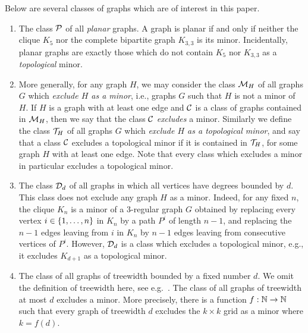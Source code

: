 \begin{example}\label{ex:classes}
Below are several classes of graphs which are of interest 
in this paper.
\begin{enumerate}
	\item The class $\cal P$ of all \emph{planar} graphs. A  graph is planar if and only if neither the clique $K_5$ nor the complete bipartite graph $K_{3,3}$ is its minor. Incidentally, planar graphs are exactly those which do not contain $K_5$ nor $K_{3,3}$ as a \emph{topological} minor.

	\item More generally, for any graph $H$, we may consider the class ${\cal M}_H$ of all graphs $G$ which \emph{exclude $H$ as a minor}, i.e., graphs $G$ such that $H$ is not a minor of $H$. If $H$ is a graph with at least one edge and ${\cal C}$ is a class of graphs contained in ${\cal M}_H$, then we say that the class ${\cal C}$
	\emph{excludes} a minor.
	Similarly we define the class ${\cal T}_H$ of all graphs $G$ which \emph{exclude $H$ as a topological minor},
	and say that a class ${\cal C}$ excludes a topological minor if it is contained in ${\cal T}_H$, for some graph $H$ with at least one edge. Note that every class which excludes a  minor in particular excludes a topological minor.
	
	
	\item The class ${\cal D}_d$ of all graphs in which all vertices have degrees bounded by $d$.
	This class does not exclude any graph $H$ as a minor. Indeed, for any fixed $n$, the clique $K_n$
	is a minor of a $3$-regular graph $G$ obtained by replacing every vertex $i\in\{1,\ldots,n\}$ in $K_n$ by a path $P^i$ of length $n-1$,
and replacing the $n-1$ edges leaving from $i$	in $K_n$ by $n-1$ edges leaving from consecutive vertices of $P^i$. However, ${\cal D}_d$ is a class which excludes a topological minor, e.g., it excludes $K_{d+1}$ as a topological minor.
	
	\item The class of all graphs of treewidth bounded by a fixed number $d$. We omit the definition of treewidth here, see e.g.~\cite{??}. The class of all graphs of treewidth at most $d$ excludes a minor. More precisely, there is a function $f:\mathbb{N}\to\mathbb{N}$ such that 
	every graph of treewidth $d$ excludes the $k\times k$ grid as a minor where $k=f(d)$.


\end{enumerate}
\end{example}
%
